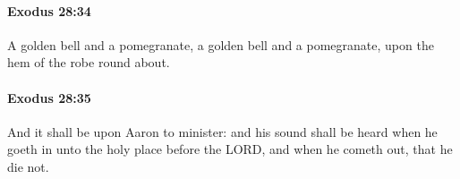 		\paragraph{Exodus 28:34} %
			\label{EXODUS-28-34}

			A golden bell and a pomegranate, a golden bell and a pomegranate, upon the hem of the robe round about.


		\paragraph{Exodus 28:35} %
			\label{EXODUS-28-35}

			And it shall be upon Aaron to minister: and his sound shall be heard when he goeth in unto the holy place before the LORD, and when he cometh out, that he die not.


